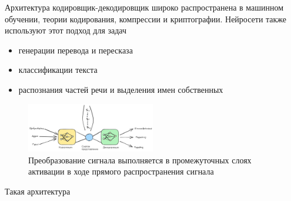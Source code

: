 Архитектура кодировщик-декодировщик широко распространена в машинном обучении, теории кодирования, компрессии и
криптографии. Нейросети также используют этот подход для задач \begin{itemize}
    \item генерации перевода и пересказа
    \item классификации текста
    \item распознания частей речи и выделения имен собственных
\end{itemize}

\begin{figure}[h]
    \centering
    \includegraphics[width=0.5\textwidth]{assets/ml/nn/encoder_decoder.excalidraw.png}
    \caption{Преобразование сигнала выполняется в промежуточных слоях активации в ходе прямого распространения сигнала}
    \label{encoder}
\end{figure}

Такая архитектура 

